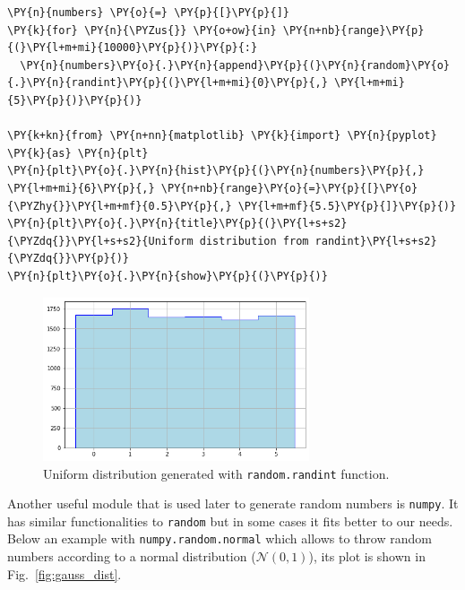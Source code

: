  \begin{codebox}
\begin{Verbatim}[commandchars=\\\{\}]
\PY{n}{numbers} \PY{o}{=} \PY{p}{[}\PY{p}{]}
\PY{k}{for} \PY{n}{\PYZus{}} \PY{o+ow}{in} \PY{n+nb}{range}\PY{p}{(}\PY{l+m+mi}{10000}\PY{p}{)}\PY{p}{:}
  \PY{n}{numbers}\PY{o}{.}\PY{n}{append}\PY{p}{(}\PY{n}{random}\PY{o}{.}\PY{n}{randint}\PY{p}{(}\PY{l+m+mi}{0}\PY{p}{,} \PY{l+m+mi}{5}\PY{p}{)}\PY{p}{)}

\PY{k+kn}{from} \PY{n+nn}{matplotlib} \PY{k}{import} \PY{n}{pyplot} \PY{k}{as} \PY{n}{plt}
\PY{n}{plt}\PY{o}{.}\PY{n}{hist}\PY{p}{(}\PY{n}{numbers}\PY{p}{,} \PY{l+m+mi}{6}\PY{p}{,} \PY{n+nb}{range}\PY{o}{=}\PY{p}{[}\PY{o}{\PYZhy{}}\PY{l+m+mf}{0.5}\PY{p}{,} \PY{l+m+mf}{5.5}\PY{p}{]}\PY{p}{)}
\PY{n}{plt}\PY{o}{.}\PY{n}{title}\PY{p}{(}\PY{l+s+s2}{\PYZdq{}}\PY{l+s+s2}{Uniform distribution from randint}\PY{l+s+s2}{\PYZdq{}}\PY{p}{)}
\PY{n}{plt}\PY{o}{.}\PY{n}{show}\PY{p}{(}\PY{p}{)}
\end{Verbatim}
\end{codebox}

\begin{figure}[h]
\centering
\includegraphics[width=0.7\textwidth]{figures/uniform.png}
\caption{Uniform distribution generated with \texttt{random.randint} function.}
\label{fig:uniform_dist}
\end{figure}
    
Another useful module that is used later to generate random numbers is \texttt{numpy}. It has similar functionalities to \texttt{random} but in some cases it fits better to our needs.    
Below an example with \texttt{numpy.random.normal} which allows to throw random numbers according to a normal distribution
(\(\mathcal{N}(0, 1)\)), its plot is shown in Fig.~\ref{fig:gauss_dist}.

